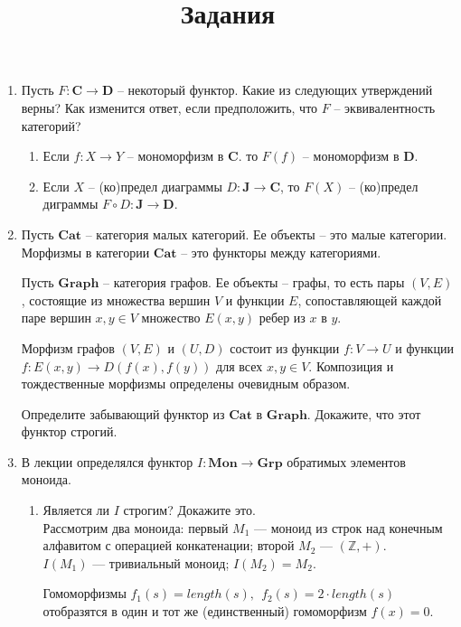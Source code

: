 \documentclass[draft]{article}
\newcommand{\cat}[1]{\mathbf{#1}}
\renewcommand{\C}{\cat{C}}
\newcommand{\D}{\cat{D}}
\newcommand{\Mon}{\cat{Mon}}
\newcommand{\Grp}{\cat{Grp}}
\begin{document}
\title{Задания}
\maketitle

\begin{enumerate}

\item Пусть $F : \C \to \D$ -- некоторый функтор.
Какие из следующих утверждений верны?
Как изменится ответ, если предположить, что $F$ -- эквивалентность категорий?
\begin{enumerate}
\item Если $f : X \to Y$ -- мономорфизм в $\C$. то $F(f)$ -- мономорфизм в $\D$.
\item Если $X$ -- (ко)предел диаграммы $D : \cat{J} \to \C$, то $F(X)$ -- (ко)предел диграммы $F \circ D : \cat{J} \to \D$.
\end{enumerate}

\item Пусть $\cat{Cat}$ -- категория малых категорий.
Ее объекты -- это малые категории.
Морфизмы в категории $\cat{Cat}$ -- это функторы между категориями.

Пусть $\cat{Graph}$ -- категория графов.
Ее объекты -- графы, то есть пары $(V,E)$, состоящие из множества вершин $V$ и функции $E$, сопоставляющей каждой паре вершин $x,y \in V$ множество $E(x,y)$ ребер из $x$ в $y$.

Морфизм графов $(V,E)$ и $(U,D)$ состоит из функции $f : V \to U$ и функции $f : E(x,y) \to D(f(x), f(y))$ для всех $x,y \in V$.
Композиция и тождественные морфизмы определены очевидным образом.

Определите забывающий функтор из $\cat{Cat}$ в $\cat{Graph}$.
Докажите, что этот функтор строгий.

\item В лекции определялся функтор $I : \Mon \to \Grp$ обратимых элементов моноида.
\begin{enumerate}
\item Является ли $I$ строгим? Докажите это.\\
Рассмотрим два моноида: первый $M_1$ --- моноид из строк над конечным алфавитом с операцией конкатенации; второй $M_2$ --- $(\mathbb{Z}, +)$.\\

$I(M_1)$ --- тривиальный моноид; $I(M_2) = M_2$.

Гомоморфизмы $f_1(s) = length(s),~~f_2(s) = 2\cdot length(s)$ отобразятся в один и тот же (единственный) гомоморфизм $f(x) = 0$.


\end{enumerate}
\end{enumerate}
\end{document}
